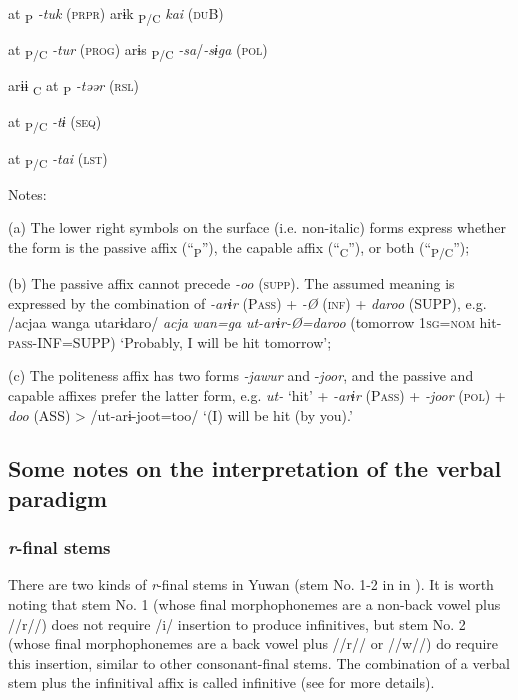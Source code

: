 \begin{table}
    at\textsubscript{ P}  \textit{{}-tuk} (\textsc{prpr})    arɨk\textsubscript{ P/C}      \textit{kai}  (\textsc{du}B)

    at\textsubscript{ P/C}  \textit{{}-tur} (\textsc{prog})    arɨs\textsubscript{ P/C}      \textit{{}-sa}/\textit{{}-sɨga}  (\textsc{pol})

  arɨɨ\textsubscript{ C}  at\textsubscript{ P}  \textit{{}-təər} (\textsc{rsl})

    at\textsubscript{ P/C}  \textit{{}-tɨ} (\textsc{seq})

    at\textsubscript{ P/C}  \textit{{}-tai} (\textsc{lst})

Notes:

(a) The lower right symbols on the surface (i.e. non-italic) forms express whether the form is the passive affix (“\textsubscript{P}”), the capable affix (“\textsubscript{C}”), or both (“\textsubscript{P/C}”);

(b) The passive affix cannot precede \textit{{}-oo} (\textsc{supp}). The assumed meaning is expressed by the combination of \textit{{}-arɨr} (P\textsc{ass}) + \textit{{}-Ø} (\textsc{inf}) + \textit{daroo} (SUPP), e.g. /acjaa wanga utarɨdaro/ \textit{acja} \textit{wan=ga} \textit{ut-arɨr-Ø=daroo} (tomorrow 1\textsc{sg}=\textsc{nom} hit-\textsc{pass}-INF=SUPP) ‘Probably, I will be hit tomorrow’;

(c) The politeness affix has two forms \textit{{}-jawur} and -\textit{joor}, and the passive and capable affixes prefer the latter form, e.g. \textit{ut-} ‘hit’ + \textit{{}-arɨr} (P\textsc{ass}) + \textit{{}-joor} (\textsc{pol}) + \textit{doo} (ASS) > /ut-arɨ-joot=too/ ‘(I) will be hit (by you).’
\end{table}

\subsection{Some notes on the interpretation of the verbal paradigm}
\subsubsection{\textit{r}{}-final stems}

There are two kinds of \textit{r}{}-final stems in Yuwan (stem No. 1-2 in  in ). It is worth noting that stem No. 1 (whose final morphophonemes are a non-back vowel plus //r//) does not require /i/ insertion to produce infinitives, but stem No. 2 (whose final morphophonemes are a back vowel plus //r// or //w//) do require this insertion, similar to other consonant-final stems. The combination of a verbal stem plus the infinitival affix is called infinitive (see  for more details).

